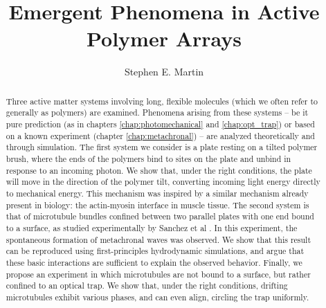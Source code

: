 \documentclass[11pt]{ucthesis}
\begin{document}

\title{Emergent Phenomena in Active Polymer Arrays}
\author{Stephen E. Martin}
\deanlinethree{}

\begin{frontmatter}

\maketitle
\newpage
\ \newpage
\tableofcontents
\listoffigures

\begin{abstract}
\begin{minipage}{\textwidth}

Three active matter systems involving long, flexible molecules (which we often refer to generally as polymers) are examined. Phenomena arising from these systems -- be it pure prediction (as in chapters \ref{chap:photomechanical} and \ref{chap:opt_trap}) or based on a known experiment (chapter \ref{chap:metachronal}) -- are analyzed theoretically and through simulation. The first system we consider is a plate resting on a tilted polymer brush, where the ends of the polymers bind to sites on the plate and unbind in response to an incoming photon. We show that, under the right conditions, the plate will move in the direction of the polymer tilt, converting incoming light energy directly to mechanical energy. This mechanism was inspired by a similar mechanism already present in biology: the actin-myosin interface in muscle tissue. The second system is that of microtubule bundles confined between two parallel plates with one end bound to a surface, as studied experimentally by Sanchez et al \cite{Sanchez2011}. In this experiment, the spontaneous formation of metachronal waves was observed. We show that this result can be reproduced using first-principles hydrodynamic simulations, and argue that these basic interactions are sufficient to explain the observed behavior. Finally, we propose an experiment in which microtubules are not bound to a surface, but rather confined to an optical trap. We show that, under the right conditions, drifting microtubules exhibit various phases, and can even align, circling the trap uniformly.


\end{minipage}
\end{abstract}
\end{frontmatter}
\end{document}
